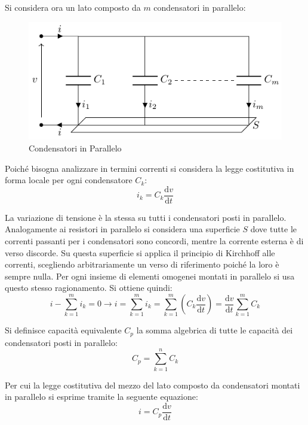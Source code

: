 \documentclass{article}
\newcommand{\df}{\mathrm{d}}
\numberwithin{equation}{subsection}
\begin{document}
Si considera ora un lato composto da $m$ condensatori in parallelo:
\begin{figure}[H]%
    \centering
    \includegraphics{condensatore-parallelo.pdf}%
    \caption{Condensatori in Parallelo}
    \label{fig:condensatore-parallelo}
\end{figure}

Poiché bisogna analizzare in termini correnti si considera la legge costitutiva in forma locale per ogni condensatore $C_k$:
\begin{equation*}
    i_k=C_k\displaystyle\frac{\df v}{\df t}
\end{equation*}

La variazione di tensione è la stessa su tutti i condensatori posti in parallelo. Analogamente ai resistori in parallelo si considera una superficie $S$ dove tutte le correnti 
passanti per i condensatori sono concordi, mentre la corrente esterna è di verso discorde. Su questa superficie si applica il principio di Kirchhoff alle correnti, scegliendo 
arbitrariamente un verso di riferimento poiché la loro è sempre nulla. Per ogni insieme di elementi omogenei montati in parallelo si usa questo stesso ragionamento. 
Si ottiene quindi:
\begin{equation*}
    i-\displaystyle\sum_{k=1}^mi_k=0\to i=\sum_{k=1}^mi_k=\sum_{k=1}^m\left(C_k\frac{\df v}{\df t}\right)=\frac{\df v}{\df t}\sum_{k=1}^mC_k
\end{equation*}

Si definisce capacità equivalente $C_p$ la somma algebrica di tutte le capacità dei condensatori posti in parallelo:
\begin{equation*}
    C_p=\displaystyle\sum_{k=1}^nC_k
\end{equation*}

Per cui la legge costitutiva del mezzo del lato composto da condensatori montati in parallelo si esprime tramite la seguente equazione:
\begin{equation}
    i=C_p\displaystyle\frac{\df v}{\df t}
\end{equation}
\end{document}
